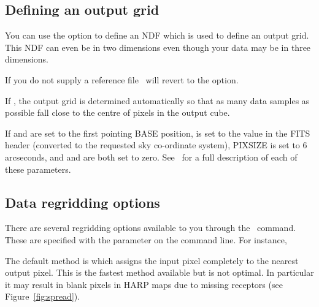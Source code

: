 \documentclass[11pt,oneside,chapters]{starlink}
\begin{document}
\subsection{Defining an output grid}
\label{sec:outputgrid}
You can use the  option to define an NDF which is used to
define an output grid. This NDF can even be in two dimensions even
though your data may be in three dimensions.
\begin{terminalv}
\end{terminalv}

If you do not supply a reference file \makecube\ will revert to the
 option.

If , the output grid is determined automatically
so that as many data samples as possible fall close to the centre of
pixels in the output cube.

If   and  are set to
the first pointing BASE position,  is set to the
 value in the FITS header (converted to the requested
sky co-ordinate system), PIXSIZE is set to 6 arcseconds, and
 and  are both set to zero. See
\smurfsun\ for a full description of each of these parameters.

\subsection{Data regridding options}
\label{sec:gridding}

There are several regridding options available to you through the
\makecube\ command. These are specified with the 
parameter on the command line.  For instance,
\begin{terminalv}
\end{terminalv}

The default method is  which assigns the input pixel
completely to the nearest output pixel. This is the fastest method
available but is not optimal. In particular it may result in blank
pixels in HARP maps due to missing receptors (see Figure~\ref{fig:spread}).

\end{document}

